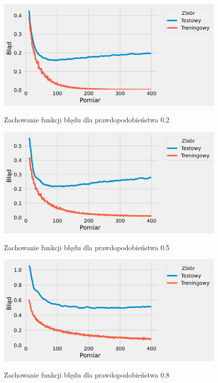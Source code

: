 \documentclass{article}
\begin{document}
\begin{figure}[H]
	\centering
	\caption{Zachowanie funkcji błędu dla prawdopodobieństwa 0.2}
	\includegraphics[width=\textwidth]{drop_err_02.png}
	\label{fig:res14}
\end{figure}
\begin{figure}[H]
	\centering
	\caption{Zachowanie funkcji błędu dla prawdopodobieństwa 0.5}
	\includegraphics[width=\textwidth]{drop_err_05.png}
	\label{fig:res15}
\end{figure}
\begin{figure}[H]
	\centering
	\caption{Zachowanie funkcji błędu dla prawdopodobieństwa 0.8}
	\includegraphics[width=\textwidth]{drop_err_08.png}
	\label{fig:res16}
\end{figure}
\end{document}
